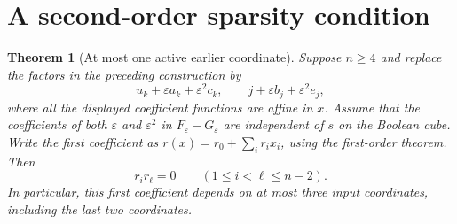 \documentclass[11pt]{article}
\newtheorem{theorem}{Theorem}
\begin{document}
\section{A second-order sparsity condition}

\begin{theorem}[At most one active earlier coordinate]
Suppose $n\ge4$ and replace the factors in the preceding construction
by
\[
 u_k+\varepsilon a_k+\varepsilon^2 c_k,
 \qquad j+\varepsilon b_j+\varepsilon^2 e_j,
\]
where all the displayed coefficient functions are affine in $x$.
Assume that the coefficients of both $\varepsilon$ and
$\varepsilon^2$ in $F_\varepsilon-G_\varepsilon$ are independent of
$s$ on the Boolean cube. Write the first coefficient as
$r(x)=r_0+\sum_i r_i x_i$, using the first-order theorem.
Then
\[
 r_i r_\ell=0\qquad(1\le i<\ell\le n-2).
\]
In particular, this first coefficient depends on at most three input
coordinates, including the last two coordinates.
\end{theorem}
\end{document}
